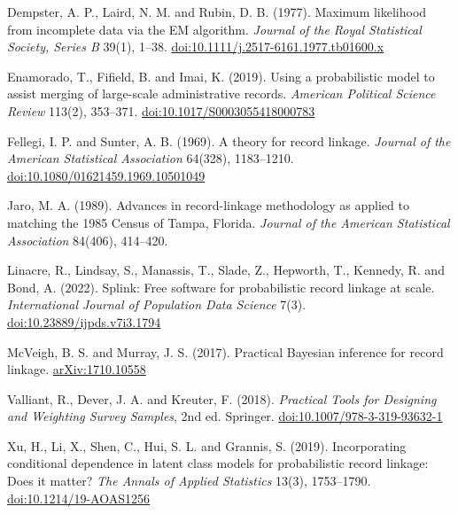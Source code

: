 \documentclass[11pt]{article}
\newenvironment{references}
  {\begin{list}{}{\setlength{\leftmargin}{1.5em}\setlength{\itemindent}{-1.5em}%
     \setlength{\itemsep}{0.35\baselineskip}\setlength{\parsep}{0pt}\raggedright}}
  {\end{list}}
\begin{document}
\begin{references}
\item Dempster, A. P., Laird, N. M. and Rubin, D. B. (1977). Maximum likelihood from incomplete data via the EM algorithm. \emph{Journal of the Royal Statistical Society, Series B} 39(1), 1--38. \href{https://doi.org/10.1111/j.2517-6161.1977.tb01600.x}{doi:10.1111/j.2517-6161.1977.tb01600.x}
\item Enamorado, T., Fifield, B. and Imai, K. (2019). Using a probabilistic model to assist merging of large-scale administrative records. \emph{American Political Science Review} 113(2), 353--371. \href{https://doi.org/10.1017/S0003055418000783}{doi:10.1017/S0003055418000783}
\item Fellegi, I. P. and Sunter, A. B. (1969). A theory for record linkage. \emph{Journal of the American Statistical Association} 64(328), 1183--1210. \href{https://doi.org/10.1080/01621459.1969.10501049}{doi:10.1080/01621459.1969.10501049}
\item Jaro, M. A. (1989). Advances in record-linkage methodology as applied to matching the 1985 Census of Tampa, Florida. \emph{Journal of the American Statistical Association} 84(406), 414--420.
\item Linacre, R., Lindsay, S., Manassis, T., Slade, Z., Hepworth, T., Kennedy, R. and Bond, A. (2022). Splink: Free software for probabilistic record linkage at scale. \emph{International Journal of Population Data Science} 7(3). \href{https://doi.org/10.23889/ijpds.v7i3.1794}{doi:10.23889/ijpds.v7i3.1794}
\item McVeigh, B. S. and Murray, J. S. (2017). Practical Bayesian inference for record linkage. \href{https://arxiv.org/abs/1710.10558}{arXiv:1710.10558}
\item Valliant, R., Dever, J. A. and Kreuter, F. (2018). \emph{Practical Tools for Designing and Weighting Survey Samples}, 2nd ed. Springer. \href{https://doi.org/10.1007/978-3-319-93632-1}{doi:10.1007/978-3-319-93632-1}
\item Xu, H., Li, X., Shen, C., Hui, S. L. and Grannis, S. (2019). Incorporating conditional dependence in latent class models for probabilistic record linkage: Does it matter? \emph{The Annals of Applied Statistics} 13(3), 1753--1790. \href{https://doi.org/10.1214/19-AOAS1256}{doi:10.1214/19-AOAS1256}
\end{references}
\end{document}
